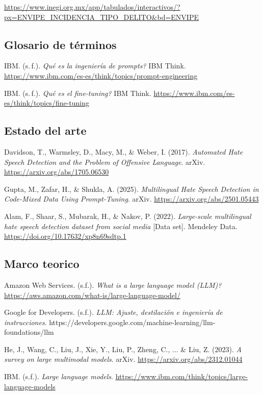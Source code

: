 \documentclass{article}
\begin{document}
\url{https://www.inegi.org.mx/app/tabulados/interactivos/?px=ENVIPE_INCIDENCIA_TIPO_DELITO&bd=ENVIPE}

\subsection{Glosario de t{\'{e}}rminos}

IBM. (s.\,f.). \textit{{\textquestiondown}Qu{\'{e}} es la ingenier{\'{i}}a de prompts?} IBM Think. \url{https://www.ibm.com/es-es/think/topics/prompt-engineering}

IBM. (s.\,f.). \textit{{\textquestiondown}Qu{\'{e}} es el fine-tuning?} IBM Think. \url{https://www.ibm.com/es-es/think/topics/fine-tuning}

\subsection{Estado del arte}


Davidson, T., Warmsley, D., Macy, M., \& Weber, I. (2017). \textit{Automated Hate Speech Detection and the Problem of Offensive Language}. arXiv. \url{https://arxiv.org/abs/1705.06530}

Gupta, M., Zafar, H., \& Shukla, A. (2025). \textit{Multilingual Hate Speech Detection in Code-Mixed Data Using Prompt-Tuning}. arXiv. \url{https://arxiv.org/abs/2501.05443}

Alam, F., Shaar, S., Mubarak, H., \& Nakov, P. (2022). \textit{Large-scale multilingual hate speech detection dataset from social media} {[}Data set{]}. Mendeley Data. \url{https://doi.org/10.17632/xp8n69sdtp.1}

\subsection{Marco teorico}

Amazon Web Services. (s.f.). \textit{What is a large language model (LLM)?} \url{https://aws.amazon.com/what-is/large-language-model/}

Google for Developers. (s.f.). \textit{LLM: Ajuste, destilaci{\'{o}}n e ingenier{\'{i}}a de instrucciones}. https://developers.google.com/machine-learning/llm-foundations/llm

He, J., Wang, C., Liu, J., Xie, Y., Liu, P., Zheng, C., ... \& Liu, Z. (2023). \textit{A survey on large multimodal models}. arXiv. \url{https://arxiv.org/abs/2312.01044}

IBM. (s.f.). \textit{Large language models}. \url{https://www.ibm.com/think/topics/large-language-models}
\end{document}
